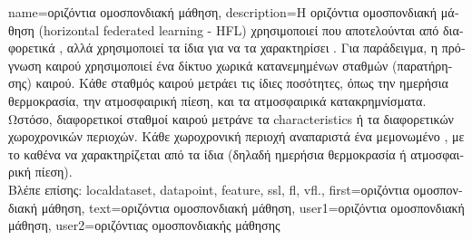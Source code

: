 {name={\foreignlanguage{greek}{οριζόντια ομοσπονδιακή μάθηση}},
	description={\foreignlanguage{greek}{Η οριζόντια ομοσπονδιακή μάθηση}\linebreak 
		(horizontal federated learning - HFL) \foreignlanguage{greek}{χρησιμοποιεί}  \foreignlanguage{greek}{που 
		αποτελούνται από διαφορετικά} , \foreignlanguage{greek}{αλλά χρησιμοποιεί τα ίδια}  
		\foreignlanguage{greek}{για να τα χαρακτηρίσει} \cite{HFLChapter2020}. \foreignlanguage{greek}{Για παράδειγμα, η πρόγνωση 
		καιρού χρησιμοποιεί ένα δίκτυο χωρικά κατανεμημένων σταθμών (παρατήρησης) καιρού. Κάθε σταθμός καιρού 
		μετράει τις ίδιες ποσότητες, όπως την ημερήσια θερμοκρασία, την ατμοσφαιρική πίεση, και τα ατμοσφαιρικά κατακρημνίσματα.
		Ωστόσο, διαφορετικοί σταθ\-μοί καιρού μετράνε τα} characteristics \foreignlanguage{greek}{ή τα}
		 \foreignlanguage{greek}{διαφορετικών χωροχρονικών περιοχών. Κάθε χωροχρονική περιοχή
		αναπαριστά ένα μεμονωμένο} , \foreignlanguage{greek}{με το καθένα να χαρακτηρίζεται από τα ίδια} 
		 \foreignlanguage{greek}{(δηλαδή ημερήσια θερμοκρασία ή ατμοσφαιρική πίεση).} \\
		\foreignlanguage{greek}{Βλέπε επίσης:} \gls{localdataset}, \gls{datapoint}, \gls{feature}, \gls{ssl}, \gls{fl}, \gls{vfl}.},
	first={\foreignlanguage{greek}{οριζόντια ομοσπονδιακή μάθηση}},
	text={\foreignlanguage{greek}{οριζόντια ομοσπονδιακή μάθηση}},
	user1={\foreignlanguage{greek}{οριζόντια ομοσπονδιακή μάθηση}}, %
	user2={\foreignlanguage{greek}{οριζόντιας ομοσπονδιακής μάθησης}} %
} 

